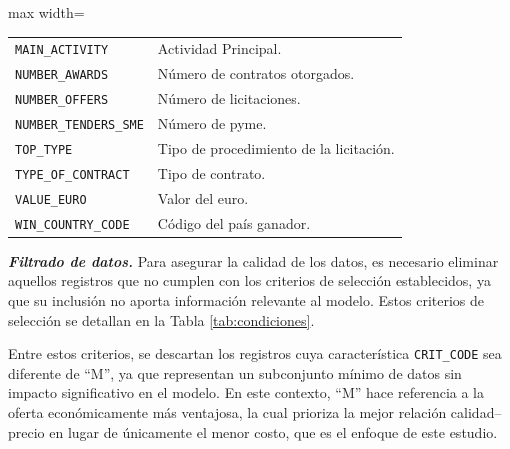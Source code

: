 \documentclass[a4paper,fleqn]{cas-sc}
\begin{document}
\begin{table}[t]
\begin{adjustbox}{max width=\textwidth}
\begin{tabular}{ll}
	\texttt{MAIN\_ACTIVITY}        & Actividad Principal. \\
	\texttt{NUMBER\_AWARDS}        & Número de contratos otorgados. \\
	\texttt{NUMBER\_OFFERS}        & Número de licitaciones. \\
	\texttt{NUMBER\_TENDERS\_SME}  & Número de pyme. \\
	\texttt{TOP\_TYPE}             & Tipo de procedimiento de la licitación.\\
	\texttt{TYPE\_OF\_CONTRACT}    & Tipo de contrato. \\
	\texttt{VALUE\_EURO}           & Valor del euro. \\
	\texttt{WIN\_COUNTRY\_CODE}    & Código del país ganador.\\
	\hline
	
	\end{tabular}
\end{adjustbox}	

\end{table}

\noindent\textbf{\textit{Filtrado de datos.}}
%
Para asegurar  la calidad de los datos, es necesario eliminar aquellos registros %
que no cumplen con los criterios de selección establecidos,
ya que su inclusión no aporta información relevante al modelo.  
Estos criterios de selección se detallan en la Tabla \ref{tab:condiciones}. 

Entre estos criterios, se descartan  los registros cuya característica \texttt{CRIT\_CODE} sea diferente de ``M'', 
ya que representan un subconjunto mínimo de datos sin impacto significativo en el modelo. En este contexto, ``M'' hace referencia a la oferta económicamente más ventajosa, la cual prioriza la mejor relación calidad--precio en lugar de únicamente el menor costo, que es el enfoque de este estudio. 
\end{document}
